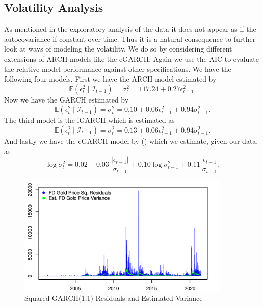 \documentclass[a4paper]{article}
\theoremstyle{definition}
\begin{document}
\subsection{Volatility Analysis}
As mentioned in the exploratory analysis of the data it does not appear as if the autocovariance if constant over time. Thus it is a natural consequence to further look at ways of modeling the volatility. We do so by considering different extensions of ARCH models like the eGARCH. Again we use the AIC to evaluate the relative model performance against other specifications. We have the following four models. First we have the ARCH model estimated by
	\begin{equation}\tag{ARCH}
	\mathbb E(\epsilon_t^2 \mid \mathcal{I}_{t-1})= \sigma_t^2 = 117.24 + 0.27 \epsilon_{t-1}^2.	
	\end{equation}
Now we have the GARCH estimated by
	\begin{equation}\tag{GARCH}
	\mathbb E(\epsilon_t^2 \mid \mathcal{I}_{t-1})= \sigma_t^2 = 0.10 + 0.06 \epsilon_{t-1}^2 + 0.94 \sigma_{t-1}^2.
	\end{equation}
The third model is the iGARCH which is estimated as
	\begin{equation}\tag{iGARCH}
	\mathbb E(\epsilon_t^2 \mid \mathcal{I}_{t-1})= \sigma_t^2 = 0.13 + 0.06 \epsilon_{t-1}^2 + 0.94 \sigma_{t-1}^2.	
	\end{equation}
And lastly we have the eGARCH model by \citeauthor{Nelson.1991} (\citeyear{Nelson.1991}) which we estimate, given our data, as
	\begin{equation}\tag{eGARCH}
	\log \sigma_t^2 = 0.02 +0.03\ \frac{| \epsilon_{t-1}|}{\sigma_{t-1}} + 0.10 \log \sigma_{t-1}^2+ 0.11\ \frac{ \epsilon_{t-1}}{\sigma_{t-1}}.
	\end{equation}		
	\begin{figure}[!t]
	\centering
	\caption{Squared GARCH(1,1) Residuals and Estimated Variance}
	\includegraphics[width=0.90\textwidth]{volatHF}
	\end{figure}	
\end{document}
